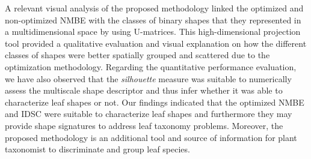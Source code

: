 {A relevant visual analysis of the proposed methodology linked the optimized and non-optimized NMBE with the classes of binary shapes that they represented in a multidimensional space by using U-matrices. This high-dimensional projection tool provided a qualitative evaluation and visual explanation on how the different classes of shapes were better spatially grouped and scattered due to the optimization methodology. Regarding the quantitative performance evaluation,  we have also observed that the \emph{silhouette} measure was suitable to numerically assess the multiscale shape descriptor and thus infer whether it was able to characterize leaf shapes or not. Our findings indicated that the optimized NMBE and IDSC were suitable to characterize leaf shapes and furthermore they may provide shape signatures to address leaf  taxonomy problems. Moreover, the proposed methodology is an additional tool and source of information for plant taxonomist to discriminate and group leaf species.
}
